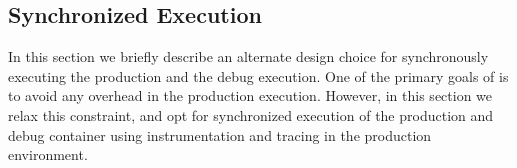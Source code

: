 
\subsection{Synchronized Execution}
\label{sec:dualExecution}

In this section we briefly describe an alternate design choice for synchronously executing the production and the debug execution.
One of the primary goals of \parikshan is to avoid any overhead in the production execution. 
However, in this section we relax this constraint, and opt for synchronized execution of the production and debug container using instrumentation and tracing in the production environment.

